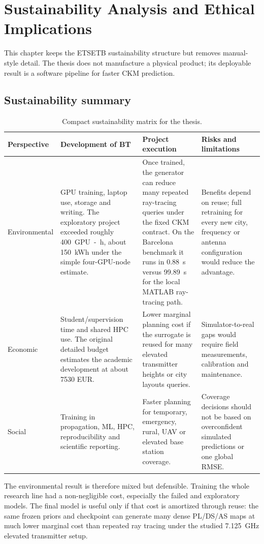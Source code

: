\chapter{Sustainability Analysis and Ethical Implications}

This chapter keeps the ETSETB sustainability structure but removes manual-style
detail. The thesis does not manufacture a physical product; its deployable result
is a software pipeline for faster CKM prediction.

\section{Sustainability summary}

\begin{table}[htbp]
\centering
\caption{Compact sustainability matrix for the thesis.}
\label{tab:sustainability_matrix}
\scriptsize
\begin{tabularx}{\textwidth}{lXXX}
\toprule
Perspective & Development of BT & Project execution & Risks and limitations \\
\midrule
Environmental & GPU training, laptop use, storage and writing. The exploratory
project exceeded roughly \SI{400}{GPU-h}, about \SI{150}{kWh} under the simple
four-GPU-node estimate. & Once trained, the generator can reduce many repeated
ray-tracing queries under the fixed CKM contract. On the Barcelona benchmark it runs in \SI{0.88}{s} versus
\SI{99.89}{s} for the local MATLAB ray-tracing path. & Benefits depend on reuse;
full retraining for every new city, frequency or antenna configuration would
reduce the advantage. \\
Economic & Student/supervision time and shared HPC use. The original detailed
budget estimates the academic development at about 7530 EUR. & Lower marginal
planning cost if the surrogate is reused for many elevated transmitter heights or city layouts
queries. & Simulator-to-real gaps would require field measurements, calibration
and maintenance. \\
Social & Training in propagation, ML, HPC, reproducibility and scientific
reporting. & Faster planning for temporary, emergency, rural, UAV or elevated base station coverage. &
Coverage decisions should not be based on overconfident simulated predictions or
one global RMSE. \\
\bottomrule
\end{tabularx}
\end{table}

The environmental result is therefore mixed but defensible. Training the whole
research line had a non-negligible cost, especially the failed and exploratory
models. The final model is useful only if that cost is amortized through reuse:
the same frozen priors and checkpoint can generate many dense PL/DS/AS maps at
much lower marginal cost than repeated ray tracing under the studied
\SI{7.125}{GHz} elevated transmitter setup.

